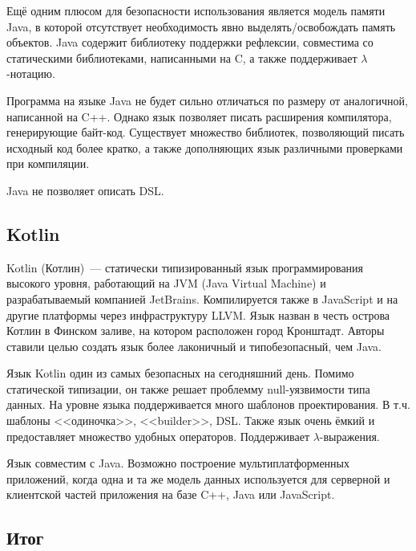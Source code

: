 Ещё одним плюсом для безопасности использования является модель памяти Java, в которой отсутствует необходимость явно выделять/освобождать память объектов. 
Java содержит библиотеку поддержки рефлексии, совместима со статическими библиотеками, написанными на C, а также поддерживает $ \lambda $-нотацию.

Программа на языке Java не будет сильно отличаться по размеру от аналогичной, написанной на C++. 
Однако язык позволяет писать расширения компилятора, генерирующие байт-код. 
Существует множество библиотек, позволяющий писать исходный код более кратко, а также дополняющих язык различными проверками при компиляции.

Java не позволяет описать DSL.

\subsection{Kotlin}

Kotlin (Котлин)~--- статически типизированный язык программирования высокого уровня, работающий на JVM (Java Virtual Machine) и разрабатываемый компанией JetBrains. 
Компилируется также в JavaScript и на другие платформы через инфраструктуру LLVM. 
Язык назван в честь острова Котлин в Финском заливе, на котором расположен город Кронштадт.
Авторы ставили целью создать язык более лаконичный и типобезопасный, чем Java. 

Язык Kotlin один из самых безопасных на сегодняшний день.
Помимо статической типизации, он также решает проблемму null-уязвимости типа данных.
На уровне языка поддерживается много шаблонов проектирования.
В т.ч. шаблоны <<одиночка>>, <<builder>>, DSL.
Также язык очень ёмкий и предоставляет множество удобных операторов.
Поддерживает $ \lambda $-выражения.

Язык совместим с Java.
Возможно построение мультиплатформенных приложений, когда одна и та же модель данных используется для серверной и клиентской частей приложения на базе C++, Java или JavaScript.

\subsection{Итог}

